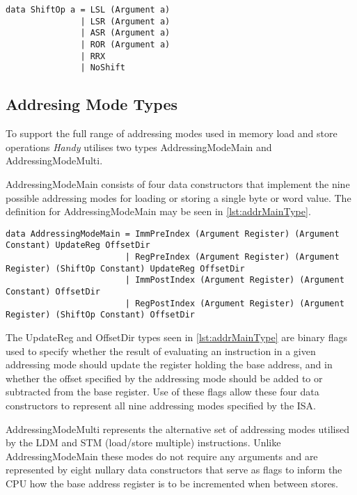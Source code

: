 \begin{lstlisting}[numbers=none,float,caption={The ShiftOp data type},label={lst:shiftType}]
data ShiftOp a = LSL (Argument a)
               | LSR (Argument a)
               | ASR (Argument a)
               | ROR (Argument a)
               | RRX
               | NoShift
\end{lstlisting}

\subsection{Addresing Mode Types}

To support the full range of addressing modes used in memory load and store operations \emph{Handy} utilises two types AddressingModeMain and AddressingModeMulti.

AddressingModeMain consists of four data constructors that implement the nine possible\citep{armarm:2005} addressing modes for loading or storing a single byte or word value. The definition for AddressingModeMain may be seen in \autoref{lst:addrMainType}.

\begin{lstlisting}[numbers=none,float,caption={The AddressingModeMain data type},label={lst:addrMainType}]
data AddressingModeMain = ImmPreIndex (Argument Register) (Argument Constant) UpdateReg OffsetDir
                        | RegPreIndex (Argument Register) (Argument Register) (ShiftOp Constant) UpdateReg OffsetDir
                        | ImmPostIndex (Argument Register) (Argument Constant) OffsetDir
                        | RegPostIndex (Argument Register) (Argument Register) (ShiftOp Constant) OffsetDir
\end{lstlisting}

The UpdateReg and OffsetDir types seen in \autoref{lst:addrMainType} are binary flags used to specify whether the result of evaluating an instruction in a given addressing mode should update the register holding the base address, and in whether the offset specified by the addressing mode should be added to or subtracted from the base register. Use of these flags allow these four data constructors to represent all nine addressing modes specified by the ISA.

AddressingModeMulti represents the alternative set of addressing modes utilised by the LDM and STM (load/store multiple) instructions\citep{armarm:2005}. Unlike AddressingModeMain these modes do not require any arguments and are represented by eight nullary data constructors that serve as flags to inform the CPU how the base address register is to be incremented when between stores.

